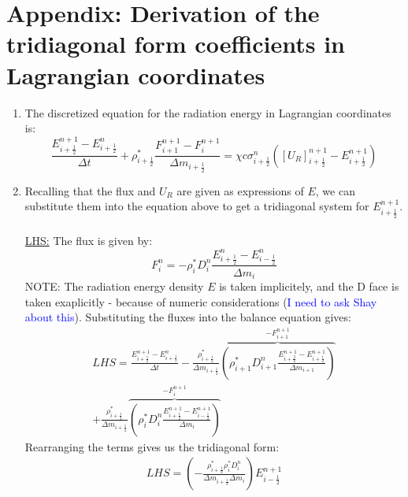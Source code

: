\documentclass[11pt]{article}
\begin{document}
\section{Appendix: Derivation of the tridiagonal form coefficients in Lagrangian coordinates}
\begin{enumerate}
  \item The discretized equation for the radiation energy in Lagrangian coordinates is:
  \begin{equation}
  \frac{E_{i+\frac{1}{2}}^{n+1} - E_{i+\frac{1}{2}}^n}{\Delta t} + \rho_{i+\frac{1}{2}}^{*} \frac{F_{i+1}^{n+1} - F_{i}^{n+1}}{\Delta m_{i+\frac{1}{2}}} =  \chi c \sigma_{i+\frac{1}{2}}^{n} ([U_R]_{i+\frac{1}{2}}^{n+1} - E_{i+\frac{1}{2}}^{n+1})
  \end{equation}
  \item Recalling that the flux and $U_R$ are given as expressions of $E$, we can substitute them into the equation above to get a tridiagonal system for $E_{i+\frac{1}{2}}^{n+1}$. \\ \\ 
  \underline{LHS:}
  The flux is given by:
  \begin{equation}
    F_{i}^{n} = -\rho_{i}^* D_{i}^n \frac{E_{i+\frac{1}{2}}^{n} - E_{i-\frac{1}{2}}^{n}}{\Delta m_{i}} 
  \end{equation}
  NOTE: The radiation energy density $E$ is taken implicitely, and the D face is taken exaplicitly - because of numeric considerations (\textcolor{blue}{I need to ask Shay about this}).
  Substituting the fluxes into the balance equation gives:
  \begin{equation}
    \begin{gathered}
  LHS = \frac{E_{i+\frac{1}{2}}^{n+1} - E_{i+\frac{1}{2}}^n}{\Delta t} - \frac{\rho_{i+\frac{1}{2}}^{*}}{\Delta m_{i+\frac{1}{2}}} \overbrace{\left(\rho_{i+1}^* D_{i+1}^n\frac{E_{i+\frac{3}{2}}^{n+1} - E_{i+\frac{1}{2}}^{n+1}}{\Delta m_{i+1}}\right)}^{-F_{i+1}^{n+1}} \\ + \frac{\rho_{i+\frac{1}{2}}^{*}}{\Delta m_{i+\frac{1}{2}}}\overbrace{\left(\rho_{i}^* D_{i}^n\frac{E_{i+\frac{1}{2}}^{n+1} - E_{i-\frac{1}{2}}^{n+1}}{\Delta m_{i}}\right)}^{-F_{i}^{n+1}}
    \end{gathered}
  \end{equation}
  Rearranging the terms gives us the tridiagonal form:
  \begin{equation}
    \begin{gathered}
  LHS = \left(-\frac{\rho_{i+\frac{1}{2}}^{*} \rho_i^* D_i^n}{\Delta m_{i+\frac{1}{2}} \Delta m_{i}} \right) E_{i-\frac{1}{2}}^{n+1} \\

\end{gathered}
\end{equation}
\end{enumerate}
\end{document}
